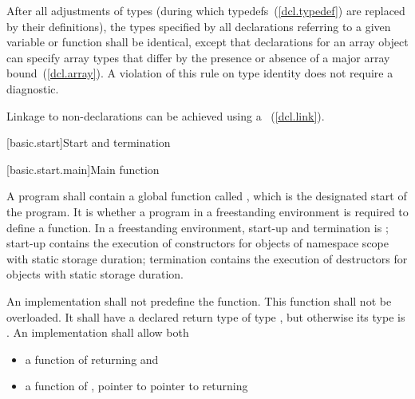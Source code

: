 \pnum
{}%
%
After all adjustments of types (during which
typedefs~(\ref{dcl.typedef}) are replaced by their definitions), the
types specified by all declarations referring to a given variable or
function shall be identical, except that declarations for an array
object can specify array types that differ by the presence or absence of
a major array bound~(\ref{dcl.array}). A violation of this rule on type
identity does not require a diagnostic.

\pnum
\enternote Linkage to non-\Cpp declarations can be achieved using a
~(\ref{dcl.link}). \exitnote%

[basic.start]{Start and termination}

[basic.start.main]{Main function}

\pnum
{}%
%
A program shall contain a global function called , which is the designated
start of the program. It is 
whether a program in a freestanding environment is required to define a 
function. \enternote In a freestanding environment, start-up and termination is
; start-up contains the
execution of constructors for objects of namespace scope with static storage duration;
termination contains the execution of destructors for objects with static storage
duration. \exitnote

\pnum
An implementation shall not predefine the  function. This
function shall not be overloaded. It shall have a declared return type of type
, but otherwise its type is .
%
An implementation shall allow both

\begin{itemize}
\item a function of \tcode{()} returning  and
\item a function of , pointer to pointer to  returning 
\end{itemize}

